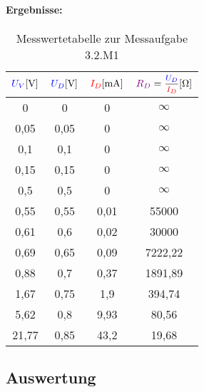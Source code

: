 \documentclass[11pt,a4paper,titlepage]{scrreprt}
\begin{document}
              \paragraph{Ergebnisse:}
                \begin{center}
                    \begin{table}[!hbtp]
                        \caption{Messwertetabelle zur Messaufgabe 3.2.M1}
                        \label{tbl:messergebnisse3.2}
                        \renewcommand{\arraystretch}{1.3}
                        \begin{center}

                        \begin{tabular}{cccc}
                            $\textcolor{blue}{U_V} [\si{\volt}]$ &
                            $\textcolor{blue}{U_D}[\si{\volt}]$ &
                            $\textcolor{red}{I_D} [\si{\milli\ampere}]$ &
                            $\widerstand{R_D} = \mfrac{\spannung{U_D}}{\strom{I_D}} [\si{\ohm}]$ \\ \hline

                            0 & 0 & 0 & $\infty$\\
                            0,05 & 0,05 & 0 & $\infty$\\
                            0,1 & 0,1 & 0 & $\infty$\\
                            0,15 & 0,15 & 0 & $\infty$\\
                            0,5 & 0,5 & 0 & $\infty$\\
                            0,55 & 0,55 & 0,01 & 55000\\
                            0,61 & 0,6 & 0,02 & 30000\\
                            0,69 & 0,65 & 0,09 & 7222,22\\
                            0,88 & 0,7 & 0,37 & 1891,89\\
                            1,67 & 0,75 & 1,9 & 394,74\\
                            5,62 & 0,8 & 9,93 & 80,56\\
                            21,77 & 0,85 & 43,2 & 19,68\\
                        \end{tabular}
                    \end{center}
                    \end{table}
                \end{center}
         \subsection{Auswertung}
\end{document}
